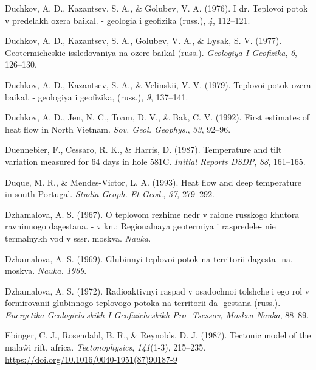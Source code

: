 \begin{CSLReferences}{1}{1}
\leavevmode{}%
Duchkov, A. D., Kazantsev, S. A., \& Golubev, V. A. (1976). I dr. Teplovoi potok v predelakh ozera baikal. - geologia i geofizika (russ.), \emph{4}, 112--121.

\leavevmode{}%
Duchkov, A. D., Kazantsev, S. A., Golubev, V. A., \& Lysak, S. V. (1977). Geotermicheskie issledovaniya na ozere baikal (russ.). \emph{Geologiya I Geofizika}, \emph{6}, 126--130.

\leavevmode{}%
Duchkov, A. D., Kazantsev, S. A., \& Velinskii, V. V. (1979). Teplovoi potok ozera baikal. - geologiya i geofizika, (russ.), \emph{9}, 137--141.

\leavevmode{}%
Duchkov, A. D., Jen, N. C., Toam, D. V., \& Bak, C. V. (1992). First estimates of heat flow in {North Vietnam}. \emph{Sov. Geol. Geophys.}, \emph{33}, 92--96.

\leavevmode{}%
Duennebier, F., Cessaro, R. K., \& Harris, D. (1987). Temperature and tilt variation measured for 64 days in hole 581C. \emph{Initial Reports DSDP}, \emph{88}, 161--165.

\leavevmode{}%
Duque, M. R., \& Mendes-Victor, L. A. (1993). Heat flow and deep temperature in south {Portugal}. \emph{Studia Geoph. Et Geod.}, \emph{37}, 279--292.

\leavevmode{}%
Dzhamalova, A. S. (1967). O teplovom rezhime nedr v raione russkogo khutora ravninnogo dagestana. - v kn.: Regionalnaya geotermiya i raspredele- nie termalnykh vod v sssr. moskva. \emph{Nauka}.

\leavevmode{}%
Dzhamalova, A. S. (1969). Glubinnyi teplovoi potok na territorii dagesta- na. moskva. \emph{Nauka. 1969}.

\leavevmode{}%
Dzhamalova, A. S. (1972). Radioaktivnyi raspad v osadochnoi tolshche i ego rol v formirovanii glubinnogo teplovogo potoka na territorii da- gestana (russ.). \emph{Energetika Geologicheskikh I Geofizicheskikh Pro- Tsessov, Moskva Nauka}, 88--89.

\leavevmode{}%
Ebinger, C. J., Rosendahl, B. R., \& Reynolds, D. J. (1987). Tectonic model of the malaŵi rift, africa. \emph{Tectonophysics}, \emph{141}(1-3), 215--235. \url{https://doi.org/10.1016/0040-1951(87)90187-9}


\end{CSLReferences}
